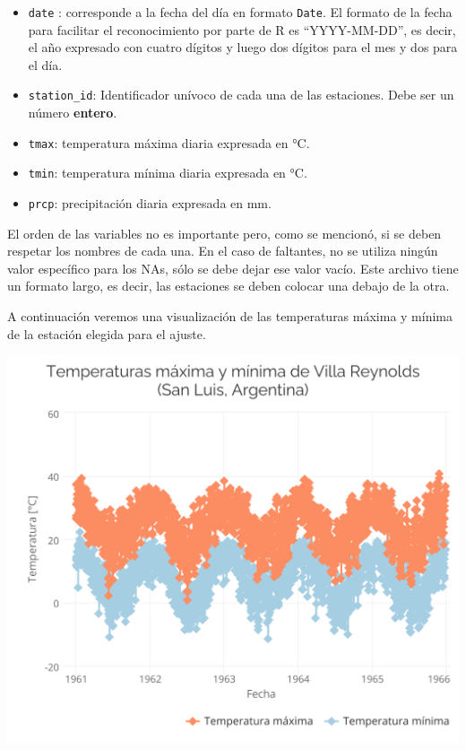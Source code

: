 \documentclass[
]{article}
\providecommand{\tightlist}{%
  \setlength{\itemsep}{0pt}\setlength{\parskip}{0pt}}
\begin{document}
\begin{itemize}
\tightlist
\item
  \texttt{date} : corresponde a la fecha del día en formato \texttt{Date}. El formato de la fecha para facilitar el reconocimiento por parte de R es ``YYYY-MM-DD'', es decir, el año expresado con cuatro dígitos y luego dos dígitos para el mes y dos para el día.
\item
  \texttt{station\_id}: Identificador unívoco de cada una de las estaciones. Debe ser un número \textbf{entero}.
\item
  \texttt{tmax}: temperatura máxima diaria expresada en °C.
\item
  \texttt{tmin}: temperatura mínima diaria expresada en °C.
\item
  \texttt{prcp}: precipitación diaria expresada en mm.
\end{itemize}

El orden de las variables no es importante pero, como se mencionó, si se deben respetar los nombres de cada una. En el caso de faltantes, no se utiliza ningún valor específico para los NAs, sólo se debe dejar ese valor vacío.
Este archivo tiene un formato largo, es decir, las estaciones se deben colocar una debajo de la otra.

A continuación veremos una visualización de las temperaturas máxima y mínima de la estación elegida para el ajuste.

\begin{center}\includegraphics{Webinario_Generador_files/figure-latex/unnamed-chunk-9-1} \end{center}
\end{document}
